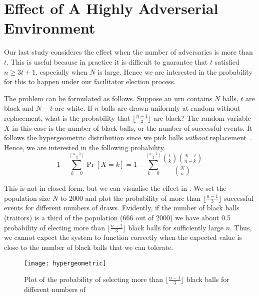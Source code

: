 \section{Effect of A Highly Adverserial Environment}

Our last study consideres the effect when the number of adversaries is more than $t$.
This is useful because in practice it is difficult to guarantee that $t$ satisfied $n \ge 3t + 1$, especially when $N$ is large.
Hence we are interested in the probability for this to happen under our facilitator election process.

The problem can be formulated as follows.
Suppose an urn contains $N$ balls, $t$ are black and $N-t$ are white.
If $n$ balls are drawn uniformly at random without replacement,
what is the probability that $\lfloor \frac{n-1}{3} \rfloor$ are black?
The random variable $X$ in this case is the number of black balls, or the number of successful events.
It follows the hypergeometric distribution since we pick balls \emph{without} replacement~\cite{skala2013hypergeometric}.
Hence, we are interested in the following probability.
$$
1 - \sum_{k = 0}^{\lfloor \frac{n-1}{3} \rfloor} \Pr[X = k] = 
1 - \sum_{k = 0}^{\lfloor \frac{n-1}{3} \rfloor} \frac{ \binom{t}{k} \binom{N-t}{n-k} }{ \binom{N}{n} }
$$

This is not in closed form,
but we can visualise the effect in .
We set the population size $N$ to 2000
and plot the probability of more than $\lfloor \frac{n-1}{3} \rfloor$ successful events for different numbers of draws.
Evidently,
if the number of black balls (traitors) is a third of the population (666 out of 2000)
we have about 0.5 probability of electing more than $\lfloor \frac{n-1}{3} \rfloor$ black balls for sufficiently large $n$.
Thus, we cannot expect the system to function correctly when 
the expected value is close to the number of black balls that we can tolerate.

\begin{figure}[h]
  \centering
  \texttt{[image: hypergeometric]}
  \caption{Plot of the probability of selecting more than $\lfloor \frac{n-1}{3} \rfloor$ black balls for
  different numbers of }
  \label{fig:hypergeometric}
\end{figure}

